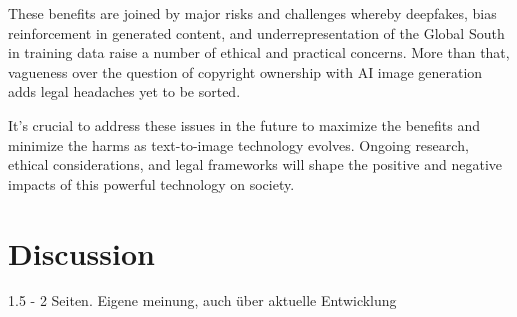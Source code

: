 \documentclass[11pt]{article}
\begin{document}
These benefits are joined by major risks and challenges whereby deepfakes, bias reinforcement in generated content, and underrepresentation of the Global South in training data raise a number of ethical and practical concerns. More than that, vagueness over the question of copyright ownership with AI image generation adds legal headaches yet to be sorted.

It's crucial to address these issues in the future to maximize the benefits and minimize the harms as text-to-image technology evolves. Ongoing research, ethical considerations, and legal frameworks will shape the positive and negative impacts of this powerful technology on society.

\section{Discussion}
1.5 - 2 Seiten. Eigene meinung, auch über aktuelle Entwicklung

\newpage


\end{document}
